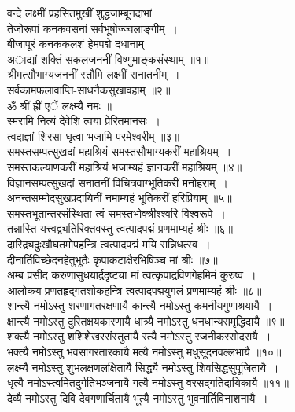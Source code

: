 \documentclass[twoside,top=1.7cm, bottom=1.7cm, outer=1cm,landscape, inner=1.5cm,a5paper,]{book}
\begin{document}
\begin{center}
वन्दे लक्ष्मीं प्रहसितमुखीं शुद्धजाम्बूनदाभां\\
तेजोरूपां कनकवसनां सर्वभूषोज्ज्वलाङ्गीम्~।\\
बीजापूरं कनककलशं हेमपद्मे दधानाम्\\
अाद्यां शक्तिं सकलजननीं विष्णुमाङ्कसंस्थाम् ॥१॥\\[10pt]
श्रीमत्सौभाग्यजननीं स्तौमि लक्ष्मीं सनातनीम्~।\\
सर्वकामफलावाप्ति-साधनैकसुखावहाम् ॥२॥\\[10pt]
ॐ श्रीं ह्रीं एें लक्ष्म्यै नमः ॥\\[10pt]
स्मरामि नित्यं देवेशि त्वया प्रेरितमानसः~।\\
त्वदाज्ञां शिरसा धृत्वा भजामि परमेश्वरीम् ॥३॥\\[10pt]
समस्तसम्पत्सुखदां महाश्रियं समस्तसौभाग्यकरीं महाश्रियम्~।\\
समस्तकल्याणकरीं महाश्रियं भजाम्यहं ज्ञानकरीं महाश्रियम् ॥४॥\\[10pt]
विज्ञानसम्पत्सुखदां सनातनीं विचित्रवाग्भूतिकरीं मनोहराम्~।\\
अनन्तसम्मोदसुखप्रदायिनीं नमाम्यहं भूतिकरीं हरिप्रियाम् ॥५॥\\[10pt]
समस्तभूतान्तरसंस्थिता त्वं समस्तभोक्त्रीश्श्वरि विश्वरूपे~।\\
तन्नास्ति यत्त्वद्व्यतिरिक्तवस्तु त्वत्पादपद्मं प्रणमाम्यहं श्रीः ॥६॥\\[10pt]
दारिद्र्यदुःखौघतमोपहन्त्रि त्वत्पादपद्मं मयि सन्निधत्स्व~।\\
दीनार्तिविच्छेदनहेतुभूतैः कृपाकटाक्षैरभिषिञ्च मां श्रीः ॥७॥\\[10pt]
अम्ब प्रसीद करुणासुधयार्द्रदृष्ट्या मां त्वत्कृपाद्रविणगेहमिमं कुरुष्व~।\\
आलोकय प्रणतहृद्गतशोकहन्त्रि त्वत्पादपद्मयुगलं प्रणमाम्यहं श्रीः ॥८॥\\[10pt]
शान्त्यै नमोऽस्तु शरणागतरक्षणायै कान्त्यै नमोऽस्तु कमनीयगुणाश्रयायै~।\\
क्षान्त्यै नमोऽस्तु दुरितक्षयकारणायै धात्र्यै नमोऽस्तु धनधान्यसमृद्धिदायै ॥९॥\\[10pt]
\newpage
शक्त्यै नमोऽस्तु शशिशेखरसंस्तुतायै रत्यै नमोऽस्तु रजनीकरसोदरायै~।\\
भक्त्यै नमोऽस्तु भवसागरतारकायै मत्यै नमोऽस्तु मधुसूदनवल्लभायै ॥१०॥\\[10pt]
लक्ष्म्यै नमोऽस्तु शुभलक्षणलक्षितायै सिद्ध्यै नमोऽस्तु शिवसिद्धसुपूजितायै~।\\
धृत्यै नमोऽस्त्वमितदुर्गतिभञ्जनायै गत्यै नमोऽस्तु वरसद्गतिदायिकायै ॥११॥\\[10pt]
देव्यै नमोऽस्तु दिवि देवगणार्चितायै भूत्यै नमोऽस्तु भुवनार्तिविनाशनायै~।\\

\end{center}
\end{document}
